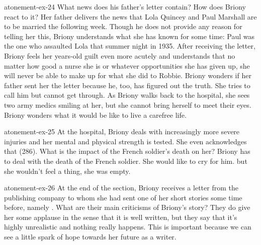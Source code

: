 \documentclass[preview]{standalone}
\begin{document}
\begin{snippetexercise}{atonement-ex-24}
    {What news does his father's letter contain? How does Briony react to it?}
    Her father delivers the news that Lola Quincey and Paul Marshall are to
    be married the following week.
    Though he does not provide any reason for telling her this,
    Briony understands what she has known for some time:
    Paul was the one who assaulted Lola that summer night in 1935.
    After receiving the letter, Briony feels her years-old guilt
    even more acutely and understands that no matter how good a nurse she is
    or whatever opportunities she has given up,
    she will never be able to make up for what she did to Robbie.
    Briony wonders if her father sent her the letter because he, too, has figured out the truth.
    She tries to call him but cannot get through.
    As Briony walks back to the hospital,
    she sees two army medics smiling at her, but she cannot bring herself to meet their eyes.
    Briony wonders what it would be like to live a carefree life.
\end{snippetexercise}

\begin{snippetexercise}{atonement-ex-25}
    {At the hospital, Briony deals with increasingly more severe injuries and her mental and physical
    strength is tested. She even acknowledges that  (286). What is the impact of the French soldier's death on her?}
    Briony has to deal with the death of the French soldier. She would like to cry for him.
    but she wouldn't feel a thing, she was empty.
\end{snippetexercise}

\begin{snippetexercise}{atonement-ex-26}
    {At the end of the section, Briony receives a letter from the publishing company to whom she had
    sent one of her short stories some time before, namely . What are their
    main criticisms of Briony's story?}
    They do give her some applause in the sense that it is well written,
    but they say that it's highly unrealistic and nothing really happens.
    This is important because we can see a little spark of hope towards her future as a writer.
\end{snippetexercise}
\end{document}
